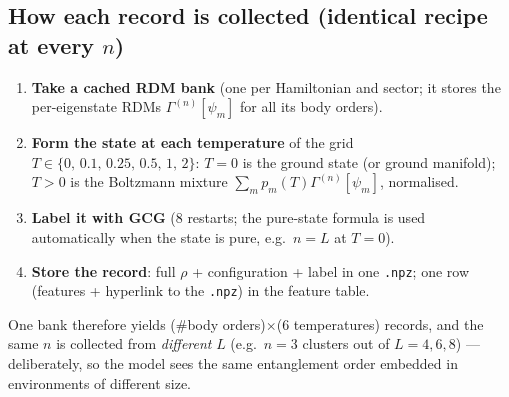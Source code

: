 \documentclass[11pt]{article}
\newcommand{\rdm}{\ensuremath{\Gamma^{(n)}}}
\begin{document}
\subsection{How each record is collected (identical recipe at every $n$)}
\begin{enumerate}[nosep]
  \item \textbf{Take a cached RDM bank} (one per Hamiltonian and sector; it
        stores the per-eigenstate RDMs $\rdm[\psi_m]$ for all its body
        orders).
  \item \textbf{Form the state at each temperature} of the grid
        $T\in\{0,\,0.1,\,0.25,\,0.5,\,1,\,2\}$: $T{=}0$ is the ground state
        (or ground manifold); $T{>}0$ is the Boltzmann mixture
        $\sum_m p_m(T)\rdm[\psi_m]$, normalised.
  \item \textbf{Label it with GCG} (8 restarts; the pure-state formula is
        used automatically when the state is pure, e.g.\ $n{=}L$ at $T{=}0$).
  \item \textbf{Store the record}: full $\rho$ + configuration + label in one
        \texttt{.npz}; one row (features + hyperlink to the \texttt{.npz}) in the
        feature table.
\end{enumerate}
One bank therefore yields (\#body orders)$\times$(6 temperatures) records,
and the same $n$ is collected from \emph{different} $L$ (e.g.\ $n=3$ clusters
out of $L=4,6,8$) --- deliberately, so the model sees the same entanglement
order embedded in environments of different size.
\end{document}
